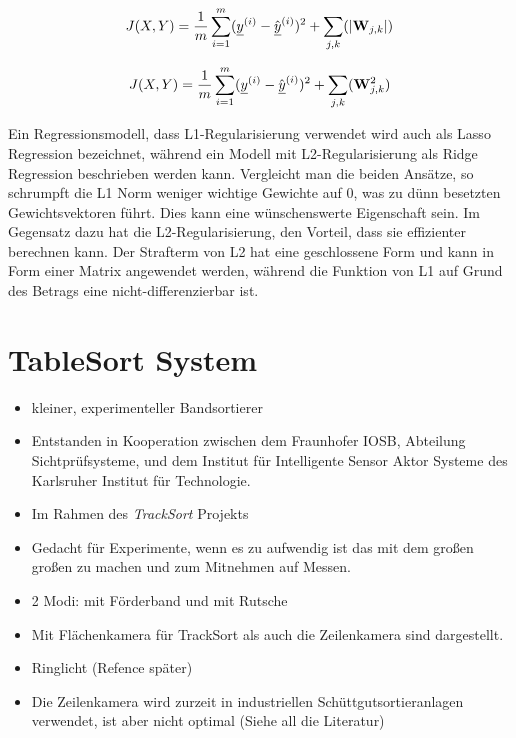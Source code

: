 \begin{equation} \label{eqn:MSE-L1}
	J(X, Y) = \frac{1}{m} \sum_{i=1}^{m} ({\underline{y}}^{(i)} - \hat{{\underline{y}}}^{(i)})^2 + \sum_{j, k} (|{{\mathbf{W}}}_{j,k}|)
\end{equation} 

\begin{equation} \label{eqn:MSE-L2}
	J(X, Y) = \frac{1}{m} \sum_{i=1}^{m} ({\underline{y}}^{(i)} - \hat{{\underline{y}}}^{(i)})^2 + \sum_{j, k} ({{\mathbf{W}}}_{j,k}^2)
\end{equation} 


Ein Regressionsmodell, dass L1-Regularisierung verwendet wird auch als Lasso Regression bezeichnet, 
während ein Modell mit L2-Regularisierung als Ridge Regression beschrieben werden kann.
Vergleicht man die beiden Ansätze, so schrumpft die L1 Norm weniger wichtige Gewichte auf 0, was zu dünn besetzten Gewichtsvektoren führt.
Dies kann eine wünschenswerte Eigenschaft sein.
Im Gegensatz dazu hat die L2-Regularisierung, den Vorteil, dass sie effizienter berechnen kann.
Der Strafterm von L2 hat eine geschlossene Form und kann in Form einer Matrix angewendet werden, während die Funktion von L1 auf Grund des Betrags eine nicht-differenzierbar ist.




\color{black}
\section{TableSort System}


\begin{itemize}
	\item kleiner, experimenteller Bandsortierer \cite{doll2015}
	\item Entstanden in Kooperation zwischen dem Fraunhofer IOSB, Abteilung Sichtprüfsysteme, und dem Institut für Intelligente Sensor Aktor Systeme des Karlsruher Institut für Technologie.
	\item Im Rahmen des \textit{TrackSort} Projekts
	\item Gedacht für Experimente, wenn es zu aufwendig ist das mit dem großen großen zu machen und zum Mitnehmen auf Messen.
	\item 2 Modi: mit Förderband und mit Rutsche
	\item Mit Flächenkamera für TrackSort als auch die Zeilenkamera sind dargestellt.
	\item Ringlicht (Refence später)
	\item Die Zeilenkamera wird zurzeit in industriellen Schüttgutsortieranlagen verwendet, ist aber nicht optimal (Siehe all die Literatur)

\end{itemize}

